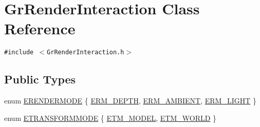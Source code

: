 \hypertarget{class_gr_render_interaction}{
\section{GrRenderInteraction Class Reference}
\label{class_gr_render_interaction}
}
{\tt \#include $<$GrRenderInteraction.h$>$}

\subsection*{Public Types}
\begin{CompactItemize}
\item 
enum \hyperlink{class_gr_render_interaction_c3028f317e185680efe057ea4df4cfd1}{ERENDERMODE} \{ \hyperlink{class_gr_render_interaction_c3028f317e185680efe057ea4df4cfd108df4903737965003ffb5d775bea155a}{ERM\_\-DEPTH}, 
\hyperlink{class_gr_render_interaction_c3028f317e185680efe057ea4df4cfd19f9d5a94aa2941cc7cab943aef59172a}{ERM\_\-AMBIENT}, 
\hyperlink{class_gr_render_interaction_c3028f317e185680efe057ea4df4cfd1a8f5a9c5dffa2c09e96bd12d119428f1}{ERM\_\-LIGHT}
 \}
\item 
enum \hyperlink{class_gr_render_interaction_4d421ff0cd482c24f75c5337174b5938}{ETRANSFORMMODE} \{ \hyperlink{class_gr_render_interaction_4d421ff0cd482c24f75c5337174b59385ee8a001357a25c9db4cd8c2aa5a9d53}{ETM\_\-MODEL}, 
\hyperlink{class_gr_render_interaction_4d421ff0cd482c24f75c5337174b59384041211e60e02f4da656fa38609ae8b8}{ETM\_\-WORLD}
 \}

\end{CompactItemize}
